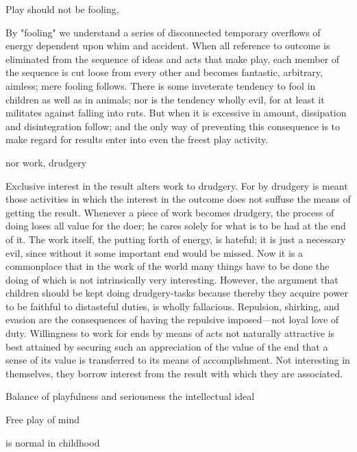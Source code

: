 \documentclass[letterpaper]{book}
\begin{document}
Play should not be fooling,

By "fooling" we understand a series of disconnected temporary overflows
of energy dependent upon whim and accident. When all reference to
outcome is eliminated from the sequence of ideas and acts that make
play, each member of the sequence is cut loose from every other and
becomes fantastic, arbitrary, aimless; mere fooling follows. There is
some inveterate tendency to fool in children as well as in animals; nor
is the tendency wholly evil, for at least it militates against falling
into ruts. But when it is excessive in amount, dissipation and
disintegration follow; and the only way of preventing this consequence
is to make regard for results enter into even the freest play
activity.

nor work, drudgery

Exclusive interest in the result alters work to drudgery. For by
drudgery is meant those activities in which the interest in the outcome
does not suffuse the means of getting the result. Whenever a piece of
work becomes drudgery, the process of doing loses all value for the
doer; he cares solely for what is to be had at the end of it. The work
itself, the putting forth of energy, is hateful; it is just a necessary
evil, since without it some important end would be missed. Now it is a
commonplace that in the work of the world many things have to be done
the doing of which is not intrinsically very interesting. However, the
argument that children should be kept doing drudgery-tasks because
thereby they acquire power to be faithful to distasteful duties, is
wholly fallacious. Repulsion, shirking, and evasion are the consequences
of having the repulsive imposed---not loyal love of duty. Willingness to
work for ends by means of acts not naturally attractive is best attained
by securing such an appreciation of the value of the end that a sense of
its value is transferred to its means of accomplishment. Not interesting
in themselves, they borrow interest from the result with which they are
associated.

Balance of playfulness and seriousness the intellectual ideal

Free play of mind

is normal in childhood
\end{document}
